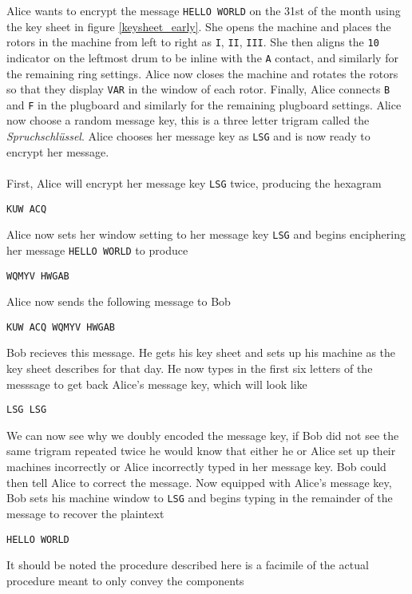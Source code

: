 \noindent Alice wants to encrypt the message \texttt{HELLO WORLD} on
the 31st of the month using the key sheet in figure
\ref{keysheet_early}. She opens the machine and places the rotors in
the machine from left to right as \texttt{I}, \texttt{II},
\texttt{III}. She then aligns the \texttt{10} indicator on the
leftmost drum to be inline with the \texttt{A} contact, and similarly
for the remaining ring settings. Alice now closes the machine and
rotates the rotors so that they display \texttt{VAR} in the window of
each rotor. Finally, Alice connects \texttt{B} and \texttt{F} in the
plugboard and similarly for the remaining plugboard settings. Alice
now choose a random message key, this is a three letter trigram
called the \emph{Spruchschlüssel}. Alice chooses her message key as
\texttt{LSG} and is now ready to encrypt her message.
\\\\First, Alice will encrypt her message key \texttt{LSG} twice,
producing the hexagram
\begin{center}
	\texttt{KUW ACQ}
\end{center}
\noindent Alice now sets her window setting to her message key
\texttt{LSG} and begins enciphering her message \texttt{HELLO WORLD} to produce
\begin{center}
	\texttt{WQMYV HWGAB}
\end{center}
Alice now sends the following message to Bob
\begin{center}
	\texttt{KUW ACQ WQMYV HWGAB}
\end{center}
\noindent Bob recieves this message. He gets his key sheet and sets
up his machine as the key sheet describes for that day. He now types
in the first six letters of the messsage to get back Alice's message
key, which will look like
\begin{center}
	\texttt{LSG LSG}
\end{center}
We can now see why we doubly encoded the message key, if Bob did not
see the same trigram repeated twice he would know that either he or
Alice set up their machines incorrectly or Alice incorrectly typed in
her message key. Bob could then tell Alice to correct the message.
Now equipped with Alice's message key, Bob sets his machine window to
\texttt{LSG} and begins typing in the remainder of the message to
recover the plaintext
\begin{center}
	\texttt{HELLO WORLD}
\end{center}
\noindent It should be noted the procedure described here is a
facimile of the actual procedure meant to only convey the components
